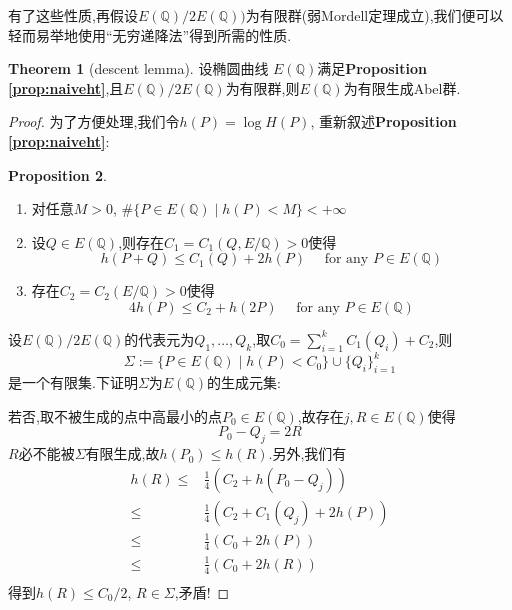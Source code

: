 \documentclass[12pt,A4paper,oneside,reqno]{amsart}
\numberwithin{equation}{section}
\theoremstyle{definition}
\newtheorem{theorem}{Theorem}[section]
\newtheorem{proposition}[theorem]{Proposition}
\theoremstyle{plain}
\theoremstyle{plain}
\numberwithin{equation}{section}
\theoremstyle{remark}
\begin{document}
有了这些性质,再假设$E(\mathbb{Q})/2E(\mathbb{Q}))$为有限群(弱Mordell定理成立),我们便可以轻而易举地使用“无穷递降法”得到所需的性质.
\begin{theorem}[descent lemma]
	设椭圆曲线 $E(\mathbb{Q})$满足\textbf{Proposition \ref{prop:naiveht}},且$E(\mathbb{Q})/2E(\mathbb{Q})$为有限群,则$E(\mathbb{Q})$为有限生成Abel群.
\end{theorem}
\begin{proof}
	为了方便处理,我们令$h(P)=\log H(P)$, 重新叙述\textbf{Proposition \ref{prop:naiveht}}:
	\begin{proposition}\label{prop:naiveht2}\
		\begin{enumerate}
			\item 对任意$M>0$, $\#\{P \in E(\mathbb{Q})\mid h(P)<M \} < + \infty$
			\item 设$Q \in E(\mathbb{Q})$,则存在$C_1=C_1(Q,E/\mathbb{Q})>0$使得
			$$h(P+Q) \leqslant C_1(Q)+2h(P)\quad\text{ for any }P \in E(\mathbb{Q})$$
			\item 存在$C_2=C_2(E/\mathbb{Q})>0$使得
			$$4h(P) \leqslant C_2+h(2P) \quad\text{ for any }P \in E(\mathbb{Q})$$
		\end{enumerate}
	\end{proposition}
设$E(\mathbb{Q})/2E(\mathbb{Q})$的代表元为$Q_1, \ldots , Q_k$,取$C_0=\sum_{i=1}^{k}C_1(Q_i)+C_2$,则
$$\Sigma:=\{P \in E(\mathbb{Q})\mid h(P)<C_0 \} \cup \{Q_i\}_{i=1}^k$$
是一个有限集.下证明$\Sigma$为$E(\mathbb{Q})$的生成元集:

若否,取不被生成的点中高最小的点$P_0 \in E(\mathbb{Q})$,故存在$j, R \in E(\mathbb{Q})$使得
$$P_0-Q_j=2R$$
$R$必不能被$\Sigma$有限生成,故$h(P_0)\leqslant h(R)$.另外,我们有
\begin{equation*}
\begin{aligned}
h(R) \leqslant & \frac{1}{4}(C_2+h(P_0-Q_j))\\
\leqslant & \frac{1}{4}(C_2+C_1(Q_j)+2h(P))\\
\leqslant & \frac{1}{4}(C_0+2h(P))\\
\leqslant & \frac{1}{4}(C_0+2h(R))\\
\end{aligned}
\end{equation*}
得到$h(R) \leqslant C_0/2$, $R \in \Sigma$,矛盾!
\end{proof}
\end{document}
